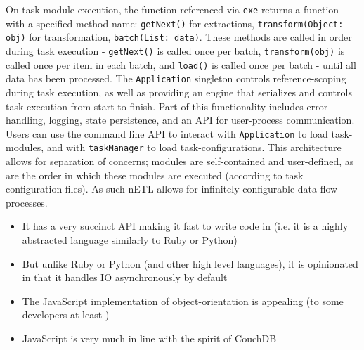 On task-module execution, the function referenced via \texttt{exe} returns a function with a specified method name: \texttt{getNext()} for extractions, \texttt{transform(Object: obj)} for transformation, \texttt{batch(List: data)}. These methods are called in order during task execution - \texttt{getNext()} is called once per batch, \texttt{transform(obj)} is called once per item in each batch, and \texttt{load()} is called once per batch - until all data has been processed. The \texttt{Application} singleton controls reference-scoping during task execution, as well as providing an engine that serializes and controls task execution from start to finish. Part of this functionality includes error handling, logging, state persistence, and an API for user-process communication. Users can use the command line API to interact with \texttt{Application} to load task-modules, and with \texttt{taskManager} to load task-configurations. This architecture allows for separation of concerns; modules are self-contained and user-defined, as are the order in which these modules are executed (according to task configuration files). As such nETL allows for infinitely configurable data-flow processes.

\begin{itemize}
    \item It has a very succinct API making it fast to write code in (i.e. it is a highly abstracted language similarly to Ruby or Python)
    \item But unlike Ruby or Python (and other high level languages), it is opinionated in that it handles IO asynchronously by default
    \item The JavaScript implementation of object-orientation is appealing (to some developers at least \cite{jsBook})
    \item JavaScript is very much in line with the spirit of CouchDB
\end{itemize}